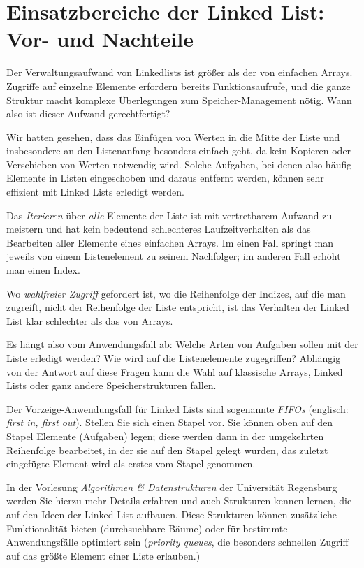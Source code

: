 \section{Einsatzbereiche der Linked List: Vor- und Nachteile} \label{sec:linkedListRuntime}
Der Verwaltungsaufwand von Linkedlists ist größer als der von einfachen Arrays. Zugriffe auf einzelne Elemente erfordern bereits Funktionsaufrufe, und die ganze Struktur macht komplexe Überlegungen zum Speicher-Management nötig. Wann also ist dieser Aufwand gerechtfertigt?

Wir hatten gesehen, dass das Einfügen von Werten in die Mitte der Liste und insbesondere an den Listenanfang besonders einfach geht, da kein Kopieren oder Verschieben von Werten notwendig wird. Solche Aufgaben, bei denen also häufig Elemente in Listen eingeschoben und daraus entfernt werden, können sehr effizient mit Linked Lists erledigt werden.

Das \emph{Iterieren} über \emph{alle} Elemente der Liste ist mit vertretbarem Aufwand zu meistern und hat kein bedeutend schlechteres Laufzeitverhalten als das Bearbeiten aller Elemente eines einfachen Arrays. Im einen Fall springt man jeweils von einem Listenelement zu seinem Nachfolger; im anderen Fall erhöht man einen Index.

Wo \emph{wahlfreier Zugriff} gefordert ist, \ie wo die Reihenfolge der Indizes, auf die man zugreift, nicht der Reihenfolge der Liste entspricht, ist das Verhalten der Linked List klar schlechter als das von Arrays.

Es hängt also vom Anwendungsfall ab: Welche Arten von Aufgaben sollen mit der Liste erledigt werden? Wie wird auf die Listenelemente zugegriffen? Abhängig von der Antwort auf diese Fragen kann die Wahl auf klassische Arrays, Linked Lists oder ganz andere Speicherstrukturen fallen.

Der Vorzeige-Anwendungsfall für Linked Lists sind sogenannte \emph{FIFOs} (englisch: \emph{first in, first out}). Stellen Sie sich einen Stapel vor. Sie können oben auf den Stapel Elemente (Aufgaben) legen; diese werden dann in der umgekehrten Reihenfolge bearbeitet, in der sie auf den Stapel gelegt wurden, \ie das zuletzt eingefügte Element wird als erstes vom Stapel genommen.

In der Vorlesung \emph{Algorithmen \& Datenstrukturen} der Universität Regensburg werden Sie hierzu mehr Details erfahren und auch Strukturen kennen lernen, die auf den Ideen der Linked List aufbauen. Diese Strukturen können zusätzliche Funktionalität bieten (\eg durchsuchbare Bäume) oder für bestimmte Anwendungsfälle optimiert sein (\eg \emph{priority queues}, die besonders schnellen Zugriff auf das größte Element einer Liste erlauben.)

